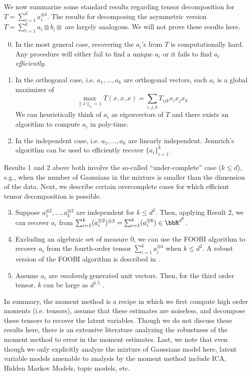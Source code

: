 We now summarize some standard results regarding tensor decomposition for $T = \sum_{i = 1}^k a_i^{\otimes 3}$. The results for decomposing the asymmetric version  $T = \sum_{i = 1}^k a_i\otimes b_i \otimes$ are largely analogous. We will not prove these results here.
\begin{enumerate}
\setcounter{enumi}{-1}
\item  In the most general case, recovering the $a_i$'s from $T$ is computationally hard. Any procedure will either fail to find a unique $a_i$ or it fails to find $a_i$ \emph{efficiently}. 
\item In the orthogonal case, i.e. $a_1,\dots,a_k$ are orthogonal vectors, each $a_i$ is a global maximizer of 
\begin{equation}
    \max_{\|x\|_2 = 1} T(x,x,x) = \sum_{i,j,k} T_{ijk} x_i x_j x_k
\end{equation}
We can heuristically think of $a_i$ as eigenvectors of $T$ and there exists an algorithm to compute $a_i$ in poly-time.
\item In the independent case, i.e. $a_1,\dots,a_k$ are linearly independent. Jennrich's algorithm can be used to efficiently recover $\{a_i\}_{i = 1}^k$.
\end{enumerate} 
Results 1 and 2 above both involve the so-called ``under-complete'' case ($k \leq d$), e.g., when the number of Gaussians in the mixture is smaller than the dimension of the data. Next, we describe certain overcomplete cases for which efficient tensor decomposition is possible.
\begin{enumerate}
\setcounter{enumi}{2}
\item Suppose $a_1^{\otimes2},\dots,a_k^{\otimes2}$ are independent for $k \leq d^2$. Then, applying Result 2, we can recover $a_i$ from $\sum_{i=1}^k (a_i^{\otimes2})^{\otimes3} = \sum_{i=1}^k (a_i^{\otimes6}) \in \bbR^{d^6}$.
\item Excluding an algebraic set of measure $0$, we can use the FOOBI algorithm to recover $a_i$ from the fourth-order tensor $\sum_{i = 1}^k a_i^{\otimes 4}$ when $k \leq d^2$. A robust version of the FOOBI algorithm is described in \citet{ma2016poly}.
\item Assume $a_i$ are \emph{randomly} generated unit vectors. Then, for the third order tensor, $k$ can be large as $d^{1.5}$ \cite{ma2016poly, schrammsteurer17}. 
\end{enumerate}

In summary, the moment method is a recipe in which we first compute high order moments (i.e. tensors), assume that these estimates are noiseless, and decompose these tensors to recover the latent variables. Though we do not discuss these results here, there is an extensive literature analyzing the robustness of the moment method to error in the moment estimates. Last, we note that even though we only explicitly analyze the mixture of Gaussians model here, latent variable models amenable to analysis by the moment method include ICA, Hidden Markov Models, topic models, etc.

